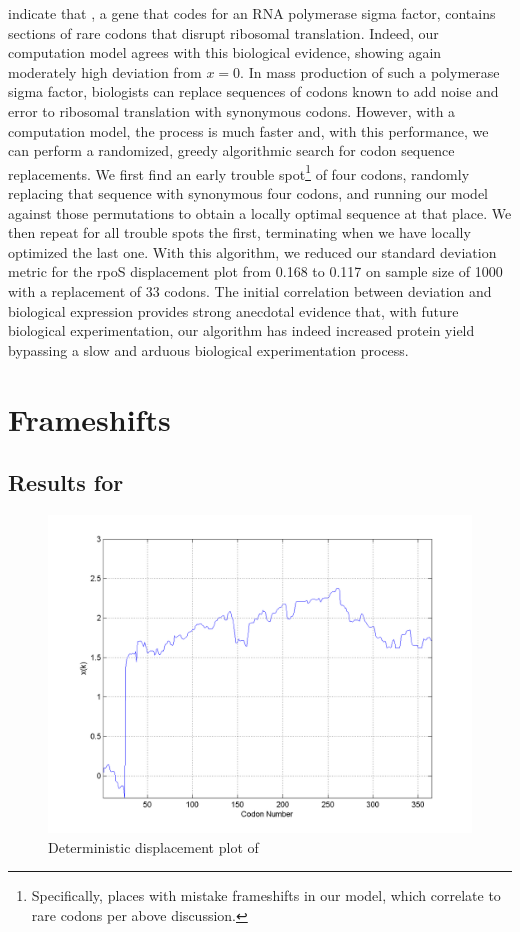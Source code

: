 \documentclass[12pt, draft]{article}
\numberwithin{equation}{section}
\begin{document}

\citet{rpos:process} indicate that \rpoS, a gene that codes for an RNA
polymerase sigma factor, contains sections of rare codons that disrupt
ribosomal translation. Indeed, our computation model agrees with this
biological evidence, showing again moderately high deviation from $x =
0$. In mass production of such a polymerase sigma factor, biologists
can replace sequences of codons known to add noise and error to
ribosomal translation with synonymous codons. 
However, with a computation model, the process is much
faster and, with this performance, we can perform a randomized, greedy
algorithmic search for codon sequence replacements. We first find an
early trouble spot\footnote{Specifically, places with
  mistake frameshifts in our model, which correlate to rare codons per
  above discussion.} of four codons, randomly replacing that sequence
with synonymous four codons, and running our model against those
permutations to obtain a locally optimal sequence at that place. We
then repeat for all trouble spots the first, terminating when we have locally
optimized the last one. With this algorithm, we reduced our standard
deviation metric for the rpoS displacement plot from 0.168 to 0.117
on sample size of 1000 with a replacement of 33 codons. The
initial correlation between deviation and biological expression
provides strong anecdotal evidence that, with future biological
experimentation, our algorithm has indeed increased protein yield
bypassing a slow and arduous biological experimentation process.

\section{Frameshifts}

\subsection{Results for \prfB}

\begin{figure}
  \centering
  \caption{Deterministic displacement plot of \prfB}
  \label{prfB}
  \includegraphics[scale=0.4]{prfB/disp}
\end{figure}
\end{document}
